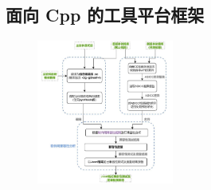 \documentclass[14pt,a4paper,UTF8,twoside]{article}
\begin{document}
\subsection{面向 Cpp 的工具平台框架}

\begin{figure}[H]
    \centering
        \includegraphics[width=0.4\textwidth]{img11/cpp.png}
        \label{fig:cpp} 
\end{figure}
\end{document}
